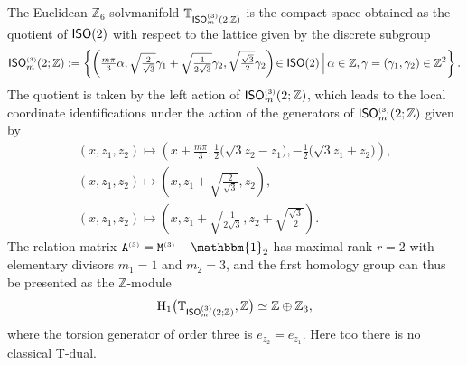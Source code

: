 \documentclass[10pt,a4paper]{amsart}
\numberwithin{equation}{section}
\newcommand{\Z}{\zed}
\newcommand{\unit}{\mathbbm{1}} 			%
\newcommand{\rmH}{{\rm H}}
\newcommand{\ISO}{{\sf ISO}}
\newcommand{\zed}{{\mathbb Z}} %
\newcommand{\torus}{{\mathbb T}} %
\begin{document}
The Euclidean
$\Z_6$-solvmanifold $\torus_{\ISO ^{\text{\tiny(3)}}_m(2;\Z)}$ is the compact
space obtained as the quotient of $\ISO(2)$ with
respect to the lattice given by the discrete subgroup
\begin{gather*} \ISO ^{\text{\tiny(3)}}_m(2;\Z) := \left\{
\left(\tfrac{m\pi}3\alpha,
\sqrt{\tfrac2{\sqrt3}} \gamma_1+\sqrt{\tfrac1{2 \sqrt3}} \gamma_2 ,
\sqrt{\tfrac{\sqrt3}2} \gamma_2\right)\!\in\ISO(2) \,
\Big| \, \alpha\in\Z,
 \gamma=(\gamma_1,\gamma_2)\in\Z^2 \right\} .
\end{gather*}
The quotient is taken by the left action of
$\ISO ^{\text{\tiny(3)}}_m(2;\Z)$, which leads
to the local coordinate identifications under the action of the
generators of $\ISO ^{\text{\tiny(3)}}_m(2;\Z)$ given by
\begin{gather*}%
(x,z_1,z_2) \longmapsto
 \left(x+\tfrac{m \pi}3 , \tfrac12 \big(\sqrt3 z_2-z_1\big) ,
 -\tfrac12 \big(\sqrt3 z_1+z_2\big)\right) , \\
(x,z_1,z_2) \longmapsto \left(x ,z_1+\sqrt{\tfrac2{\sqrt3}} , z_2\right) , \\
(x,z_1,z_2) \longmapsto \left(x , z_1+\sqrt{\tfrac1{2 \sqrt3}},
 z_2+\sqrt{\tfrac{\sqrt3}2} \right) .
\end{gather*}
The relation matrix ${\tt A}^{\text{\tiny(3)}} = {\tt M}^{\text{\tiny(3)}}-\unit_2$ has maximal rank $r=2$ with elementary divisors $m_1=1$ and
$m_2=3$, and the first homology group can thus be presented as the $\Z$-module
\[
\rmH_1\big(\torus_{\ISO ^{\text{\tiny(3)}}_m(2;\Z)},\Z\big) \simeq \Z\oplus\Z_3 ,
\]
where the torsion generator of order three is $e_{z_2}=e_{z_1}$. Here too there is no
classical T-dual.
\end{document}
